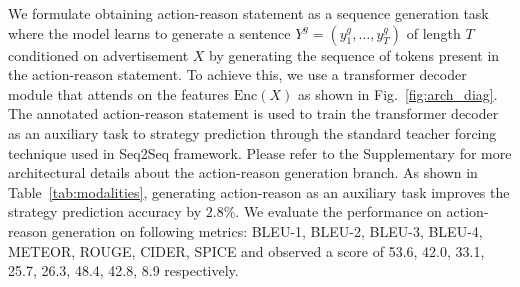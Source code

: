 \documentclass[hidelinks,11pt,a4paper]{report}
\begin{document}
We formulate obtaining action-reason statement as a sequence generation task where the model learns to generate a sentence $Y^g=(y^g_1, \ldots, y^g_T)$ of length $T$ conditioned on advertisement $X$ by generating the sequence of tokens present in the action-reason statement. To achieve this, we use a transformer decoder module that attends on the features $\text{Enc}(X)$ as shown in Fig.~\ref{fig:arch_diag}. The annotated action-reason statement is used to train the transformer decoder as an auxiliary task to strategy prediction through the standard teacher forcing technique used in Seq2Seq framework. Please refer to the Supplementary for more architectural details about the action-reason generation branch. As shown in Table~\ref{tab:modalities}, generating action-reason as an auxiliary task improves the strategy prediction accuracy by $2.8\%$. We evaluate the performance on action-reason generation on following metrics: BLEU-1, BLEU-2, BLEU-3, BLEU-4, METEOR, ROUGE, CIDER, SPICE and observed a score of 53.6, 42.0, 33.1, 25.7, 26.3, 48.4, 42.8, 8.9 respectively.



\end{document}
